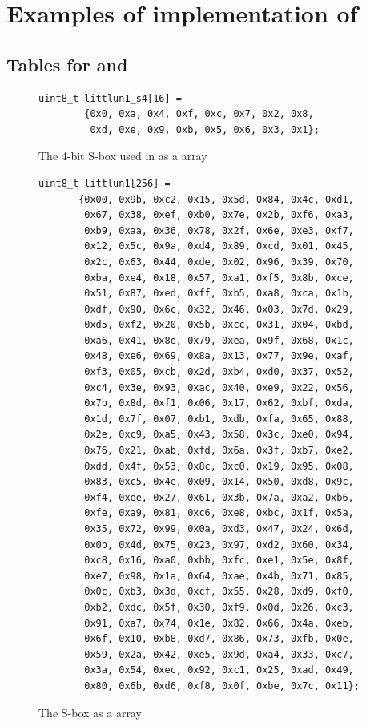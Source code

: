 \section{Examples of implementation of \littlunOne}

\subsection{Tables for \littlunOne and \littlunS}
\label{sec:sbox_tables}

\begin{figure}[ht]
\begin{verbatim}
uint8_t littlun1_s4[16] =
		{0x0, 0xa, 0x4, 0xf, 0xc, 0x7, 0x2, 0x8,
		 0xd, 0xe, 0x9, 0xb, 0x5, 0x6, 0x3, 0x1};
\end{verbatim}
\caption{The 4-bit S-box \littlunS used in \littlunOne as a \C array\label{tab4}}
\end{figure}

\begin{figure}[ht]
\begin{verbatim}
uint8_t littlun1[256] =
       {0x00, 0x9b, 0xc2, 0x15, 0x5d, 0x84, 0x4c, 0xd1,
        0x67, 0x38, 0xef, 0xb0, 0x7e, 0x2b, 0xf6, 0xa3,
        0xb9, 0xaa, 0x36, 0x78, 0x2f, 0x6e, 0xe3, 0xf7,
        0x12, 0x5c, 0x9a, 0xd4, 0x89, 0xcd, 0x01, 0x45,
        0x2c, 0x63, 0x44, 0xde, 0x02, 0x96, 0x39, 0x70,
        0xba, 0xe4, 0x18, 0x57, 0xa1, 0xf5, 0x8b, 0xce,
        0x51, 0x87, 0xed, 0xff, 0xb5, 0xa8, 0xca, 0x1b,
        0xdf, 0x90, 0x6c, 0x32, 0x46, 0x03, 0x7d, 0x29,
        0xd5, 0xf2, 0x20, 0x5b, 0xcc, 0x31, 0x04, 0xbd,
        0xa6, 0x41, 0x8e, 0x79, 0xea, 0x9f, 0x68, 0x1c,
        0x48, 0xe6, 0x69, 0x8a, 0x13, 0x77, 0x9e, 0xaf,
        0xf3, 0x05, 0xcb, 0x2d, 0xb4, 0xd0, 0x37, 0x52,
        0xc4, 0x3e, 0x93, 0xac, 0x40, 0xe9, 0x22, 0x56,
        0x7b, 0x8d, 0xf1, 0x06, 0x17, 0x62, 0xbf, 0xda,
        0x1d, 0x7f, 0x07, 0xb1, 0xdb, 0xfa, 0x65, 0x88,
        0x2e, 0xc9, 0xa5, 0x43, 0x58, 0x3c, 0xe0, 0x94,
        0x76, 0x21, 0xab, 0xfd, 0x6a, 0x3f, 0xb7, 0xe2,
        0xdd, 0x4f, 0x53, 0x8c, 0xc0, 0x19, 0x95, 0x08,
        0x83, 0xc5, 0x4e, 0x09, 0x14, 0x50, 0xd8, 0x9c,
        0xf4, 0xee, 0x27, 0x61, 0x3b, 0x7a, 0xa2, 0xb6,
        0xfe, 0xa9, 0x81, 0xc6, 0xe8, 0xbc, 0x1f, 0x5a,
        0x35, 0x72, 0x99, 0x0a, 0xd3, 0x47, 0x24, 0x6d,
        0x0b, 0x4d, 0x75, 0x23, 0x97, 0xd2, 0x60, 0x34,
        0xc8, 0x16, 0xa0, 0xbb, 0xfc, 0xe1, 0x5e, 0x8f,
        0xe7, 0x98, 0x1a, 0x64, 0xae, 0x4b, 0x71, 0x85,
        0x0c, 0xb3, 0x3d, 0xcf, 0x55, 0x28, 0xd9, 0xf0,
        0xb2, 0xdc, 0x5f, 0x30, 0xf9, 0x0d, 0x26, 0xc3,
        0x91, 0xa7, 0x74, 0x1e, 0x82, 0x66, 0x4a, 0xeb,
        0x6f, 0x10, 0xb8, 0xd7, 0x86, 0x73, 0xfb, 0x0e,
        0x59, 0x2a, 0x42, 0xe5, 0x9d, 0xa4, 0x33, 0xc7,
        0x3a, 0x54, 0xec, 0x92, 0xc1, 0x25, 0xad, 0x49,
        0x80, 0x6b, 0xd6, 0xf8, 0x0f, 0xbe, 0x7c, 0x11};
\end{verbatim}
\caption{The \littlunOne S-box as a \C array\label{tab8}}
\end{figure}

